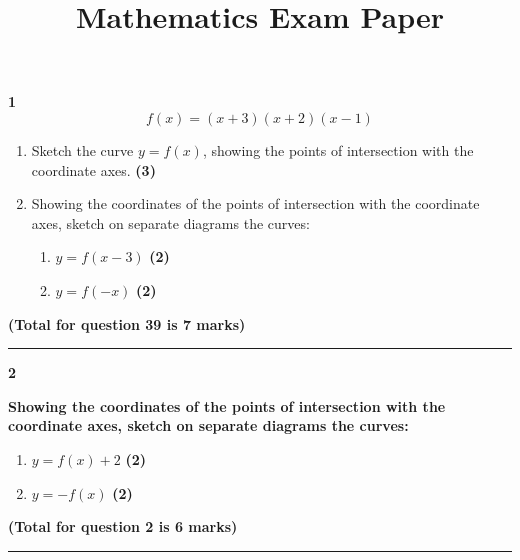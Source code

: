 \documentclass[a4paper,12pt]{article}
\begin{document}
 
\title{\textbf{Mathematics Exam Paper}} %
\date{} %
\maketitle %

\begin{tcolorbox}
[width=\textwidth, height=\textheight, colframe=black, colback=white, arc=5mm, boxrule=0.2mm]


\textbf{1} \hspace{1em} 
\[f(x) = (x + 3)(x + 2)(x - 1)\] 

\begin{enumerate}[label=(\alph*)]
\item Sketch the curve \( y = f(x) \), showing the points of intersection with the coordinate axes. \hfill \textbf{(3)}
\item Showing the coordinates of the points of intersection with the coordinate axes, sketch on separate diagrams the curves:
    \begin{enumerate}[label=(\roman*)]
    \item \( y = f(x - 3) \) \hfill \textbf{(2)}
    \item \( y = f(-x) \) \hfill \textbf{(2)}
    \end{enumerate}
\end{enumerate}

\hfill \textbf{(Total for question 39 is 7 marks)}

\hrule height 0.4pt
\vspace{1em}


\textbf{2} \hspace{1em}

\textbf{Showing the coordinates of the points of intersection with the coordinate axes, sketch on separate diagrams the curves:}
\begin{enumerate}[label=(\alph*)]
\vfill
\item \( y = f(x) + 2 \) \hfill \textbf{(2)}
\item \( y = -f(x) \) \hfill \textbf{(2)}
\vfill
\end{enumerate}

\hfill \textbf{(Total for question 2 is 6 marks)}

\hrule height 0.4pt
\vspace{1em}



\end{tcolorbox}
\end{document}
